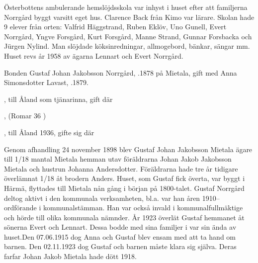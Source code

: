 
Österbottens ambulerande hemslöjdsskola var inhyst i huset efter att familjerna Norrgård byggt varsitt eget hus. Clarence Back från Kimo var lärare. Skolan hade 9 elever från orten: Valfrid Häggstrand, Ruben Eklöv, Uno Gunell, Evert Norrgård, Yngve Forsgård, Kurt Forsgård, Manne Strand, Gunnar Forsbacka och Jürgen Nylind. Man slöjdade köksinredningar, allmogebord, bänkar, sängar mm. Huset revs år 1958 av ägarna Lennart och Evert Norrgård.


Bonden Gustaf Johan Jakobsson Norrgård, .1878 på Mietala, gift med Anna Simonsdotter Lavast, .1879.
\begin{jhchildren}
  \item {}, till Åland som tjänarinna, gift där
  \item {}
  \item {}
  \item {}
  \item {}, (Romar 36 )
  \item {}, till Åland 1936, gifte sig där
\end{jhchildren}
Genom afhandling 24 november 1898 blev Gustaf Johan Jakobsson Mietala ägare till 1/18 mantal Mietala hemman utav föräldrarna Johan Jakob Jakobsson Mietala och hustrun Johanna Andersdotter. Föräldrarna hade tre år tidigare överlämnat 1/18 åt brodern Anders.
Huset, som Gustaf fick överta, var byggt i Härmä, flyttades till Mietala nån gång i början på 1800-talet. Gustaf Norrgård deltog aktivt i den kommunala verksamheten, bl.a. var han åren 1910-- ordförande i kommunalstämman. Han var också invald i kommunalfullmäktige och hörde till olika kommunala nämnder. År 1923 överlät Gustaf hemmanet åt sönerna Evert och
Lennart. Dessa bodde med sina familjer i var sin ända av huset.Den 07.06.1915 dog Anna och Gustaf blev ensam med att ta hand om barnen. Den 02.11.1923 dog Gustaf och barnen måste klara sig själva. Deras farfar Johan Jakob Mietala hade dött 1918.


